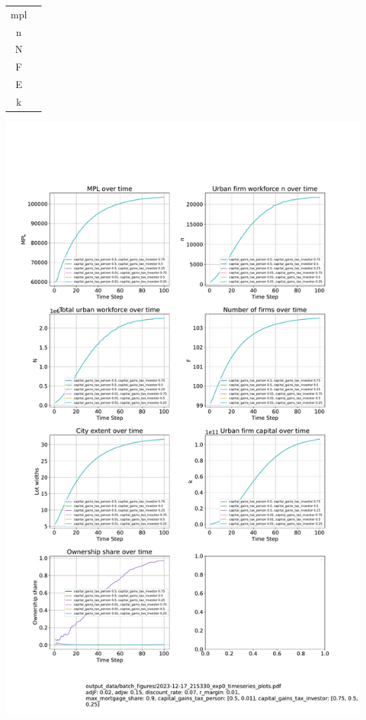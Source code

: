 



 \newpage


\begin{tabular}{c|c}
  mpl  &  \\
  n   &  \\
  N   &  \\
  F   &  \\
  E   &  \\
  k   & 
\end{tabular} 

 \includegraphics[scale=.25]{215330-exp0-timeseries-plots.pdf}
